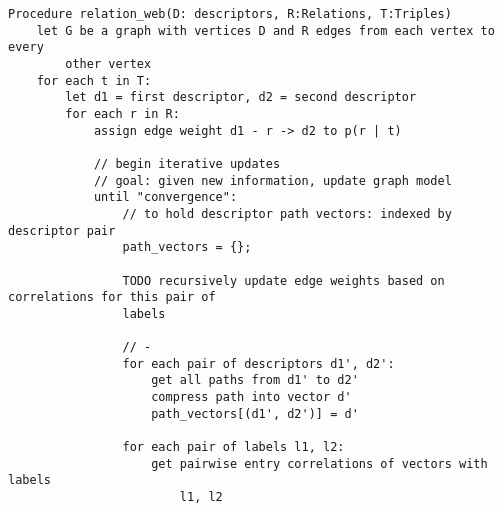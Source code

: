 \documentclass[a4paper]{article}
\begin{document}
\begin{verbatim}
Procedure relation_web(D: descriptors, R:Relations, T:Triples)
    let G be a graph with vertices D and R edges from each vertex to every
        other vertex
    for each t in T:
        let d1 = first descriptor, d2 = second descriptor
        for each r in R:
            assign edge weight d1 - r -> d2 to p(r | t)

            // begin iterative updates
            // goal: given new information, update graph model
            until "convergence":
                // to hold descriptor path vectors: indexed by descriptor pair
                path_vectors = {};

                TODO recursively update edge weights based on correlations for this pair of
                labels
                
                // - 
                for each pair of descriptors d1', d2':
                    get all paths from d1' to d2'
                    compress path into vector d'
                    path_vectors[(d1', d2')] = d'

                for each pair of labels l1, l2:
                    get pairwise entry correlations of vectors with labels
                        l1, l2
\end{verbatim}

%
%
\end{document}
